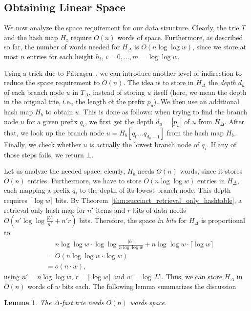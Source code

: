 \documentclass[a4paper,11pt]{article}
\newtheorem{lemma}[theorem]{Lemma}
\newcommand{\?}{\mskip1.5mu}
\begin{document}
\subsection{Obtaining Linear Space}
We now analyze the space requirement for our
data structure.
Clearly,  the  trie $T$ and the
hash map $H_z$ require $O(n)$ words of space.
Furthermore, as described so far, the number of 
words needed for
$H_\Delta$ is $O(n \log\log w)$, since 
we store at most $n$ entries for each 
height $h_i$, $i = 0, \dots, m = \log\log w$.

Using a trick due to P\v{a}tra\c{s}cu~\cite{Patrascu10}, 
we can introduce another level of indirection to reduce 
the space requirement to  $O(n)$.
The idea is to store in $H_\Delta$ the \emph{depth}
$d_u$ of each branch node $u$ in $T_\Delta$, instead of storing 
$u$ itself (here, we mean the depth in the
original trie, i.e., the length of the prefix $p_u$). 
We then use an additional hash map 
$H_b$ to obtain $u$.
This is done as follows:
when trying to find the branch node $u$ for a given
prefix $q_i$, we 
first get the depth $d_u = |p_u|$ of $u$ 
from $H_\Delta$. After that, we look up the branch
node $u = H_b[q_0 \dots q_{d_u-1}]$ from the hash map 
$H_b$. Finally, we check whether $u$ is actually the 
lowest branch node of $q_i$. If any of those steps fails,
we return $\bot$.

Let us analyze the needed space: clearly, $H_b$ needs
$O(n)$ words, since it stores $O(n)$ entries.
Furthermore,
we have to store $O(n \log\log w)$ entries in 
$H_\Delta$, each mapping a prefix $q_i$ to the depth of 
its lowest branch node. This depth requires
$\lceil \log w \rceil$ bits.
By Theorem~\ref{thm:succinct_retrieval_only_hashtable},
a retrieval only hash map for $n'$ items and $r$ bits 
of data needs $O(n'\log\log \frac{|U|}{n'} + n'r)$ bits.
Therefore, the space 
\emph{in bits} for $H_\Delta$ is proportional to
\begin{align*}
&\phantom{=} n \log\log w \cdot \log\log \frac{|U|}{n \log\log w} +
n \log\log w \cdot \lceil \log w \rceil\\
&= O(n \log\log w \cdot \log w)\\
&= o(n\cdot w),
\end{align*}
using $n' = n\log\log w$, $r = \lceil \log w \rceil$ and $w = \log |U|$. 
Thus, we can store $H_\Delta$ in 
$O(n)$ words of $w$ bits each. The following lemma summarizes
the discussion

\begin{lemma}
\label{lemma:delta_linear_space}
The $\Delta$-fast trie needs $O(n)$ words space.
\end{lemma}
\end{document}
